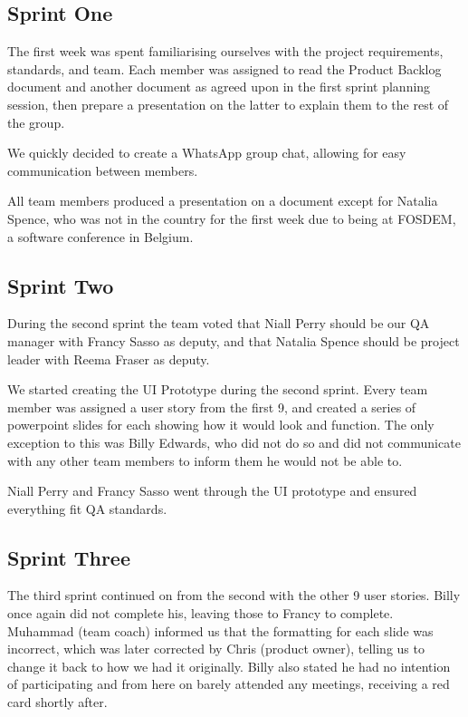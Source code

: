 \documentclass[a4paper]{project}
\begin{document}
		\subsection{Sprint One}\label{subsec:sprint-one}
		
			The first week was spent familiarising ourselves with the project requirements, standards, and team. Each member was assigned to read the Product Backlog \cite{Product Backlog} document and another document as agreed upon in the first sprint planning session, then prepare a presentation on the latter to explain them to the rest of the group.
			
			We quickly decided to create a WhatsApp group chat, allowing for easy communication between members.
			
			All team members produced a presentation on a document except for Natalia Spence, who was not in the country for the first week due to being at FOSDEM, a software conference in Belgium.
			
		\subsection{Sprint Two}\label{subsec:sprint-two}
		
			During the second sprint the team voted that Niall Perry should be our QA manager with Francy Sasso as deputy, and that Natalia Spence should be project leader with Reema Fraser as deputy.
			
			We started creating the UI Prototype \cite{DS1} during the second sprint. Every team member was assigned a user story from the first 9, and created a series of powerpoint slides for each showing how it would look and function. The only exception to this was Billy Edwards, who did not do so and did not communicate with any other team members to inform them he would not be able to.
			
			Niall Perry and Francy Sasso went through the UI prototype and ensured everything fit QA standards.
			
		\subsection{Sprint Three}\label{subsec:sprint-three}
		
			The third sprint continued on from the second with the other 9 user stories. Billy once again did not complete his, leaving those to Francy to complete. Muhammad (team coach) informed us that the formatting for each slide was incorrect, which was later corrected by Chris (product owner), telling us to change it back to how we had it originally. Billy also stated he had no intention of participating and from here on barely attended any meetings, receiving a red card shortly after.
			
\end{document}

